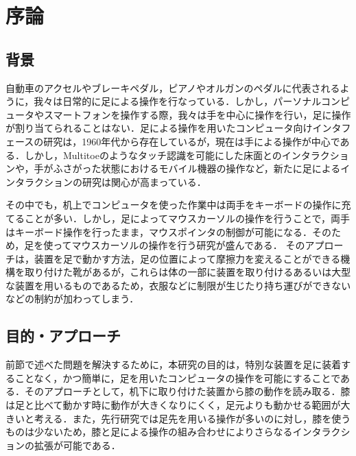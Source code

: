 \chapter{序論}

\section{背景}
自動車のアクセルやブレーキペダル，ピアノやオルガンのペダルに代表されるように，我々は日常的に足による操作を行なっている．しかし，パーソナルコンピュータやスマートフォンを操作する際，我々は手を中心に操作を行い，足に操作が割り当てられることはない．足による操作を用いたコンピュータ向けインタフェースの研究は，1960年代から存在している\cite{1698228}が，現在は手による操作が中心である．しかし，Multitoe\cite{Augsten:2010:MHI:1866029.1866064}のようなタッチ認識を可能にした床面とのインタラクションや，手がふさがった状態におけるモバイル機器の操作\cite{Fan:2017:ESF:3123021.3123043, okumura_2011}など，新たに足によるインタラクションの研究は関心が高まっている．\par
その中でも，机上でコンピュータを使った作業中は両手をキーボードの操作に充てることが多い．しかし，足によってマウスカーソルの操作を行うことで，両手はキーボード操作を行ったまま，マウスポインタの制御が可能になる．そのため，足を使ってマウスカーソルの操作を行う研究が盛んである．
%
そのアプローチは，装置を足で動かす方法\cite{Pearson:1986:MMD:22627.22392, Pearson:1988:EET:49108.1046356}，足の位置によって摩擦力を変えることができる機構を取り付けた靴\cite{Horodniczy:2017:FHE:3025453.3025625}があるが，これらは体の一部に装置を取り付けるあるいは大型な装置を用いるものであるため，衣服などに制限が生じたり持ち運びができないなどの制約が加わってしまう．



\section{目的・アプローチ}
前節で述べた問題を解決するために，本研究の目的は，特別な装置を足に装着することなく，かつ簡単に，足を用いたコンピュータの操作を可能にすることである．そのアプローチとして，机下に取り付けた装置から膝の動作を読み取る．膝は足と比べて動かす時に動作が大きくなりにくく，足元よりも動かせる範囲が大きいと考える．また，先行研究では足先を用いる操作が多いのに対し，膝を使うものは少ない\cite{1698228}ため，膝と足による操作の組み合わせによりさらなるインタラクションの拡張が可能である．

